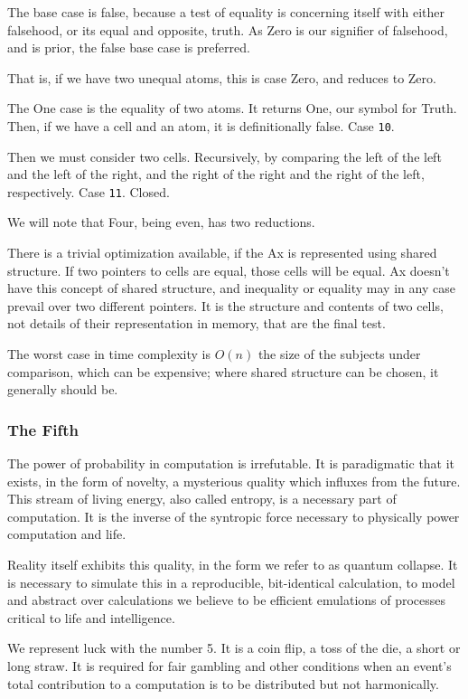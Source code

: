 \documentclass[twoside]{article}
\begin{document}
The base case is false, because a test of equality is concerning itself with either falsehood, or its equal and opposite, truth. As Zero is our signifier of falsehood, and is prior, the false base case is preferred.

That is, if we have two unequal atoms, this is case Zero, and reduces to Zero.

The One case is the equality of two atoms. It returns One, our symbol for Truth. Then, if we have a cell and an atom, it is definitionally false. Case \texttt{10}.

Then we must consider two cells. Recursively, by comparing the left of the left and the left of the right, and the right of the right and the right of the left, respectively. Case \texttt{11}. Closed.

We will note that Four, being even, has two reductions.

There is a trivial optimization available, if the Ax is represented using shared structure. If two pointers to cells are equal, those cells will be equal. Ax doesn't have this concept of shared structure, and inequality or equality may in any case prevail over two different pointers. It is the structure and contents of two cells, not details of their representation in memory, that are the final test.

The worst case in time complexity is $O(n)$ the size of the subjects under comparison, which can be expensive; where shared structure can be chosen, it generally should be.

\subsubsection{The Fifth}

The power of probability in computation is irrefutable. It is paradigmatic that it exists, in the form of novelty, a mysterious quality which influxes from the future. This stream of living energy, also called entropy, is a necessary part of computation. It is the inverse of the syntropic force necessary to physically power computation and life.

Reality itself exhibits this quality, in the form we refer to as quantum collapse. It is necessary to simulate this in a reproducible, bit-identical calculation, to model and abstract over calculations we believe to be efficient emulations of processes critical to life and intelligence.

We represent luck with the number 5. It is a coin flip, a toss of the die, a short or long straw.  It is required for fair gambling and other conditions when an event's total contribution to a computation is to be distributed but not harmonically.
\end{document}
